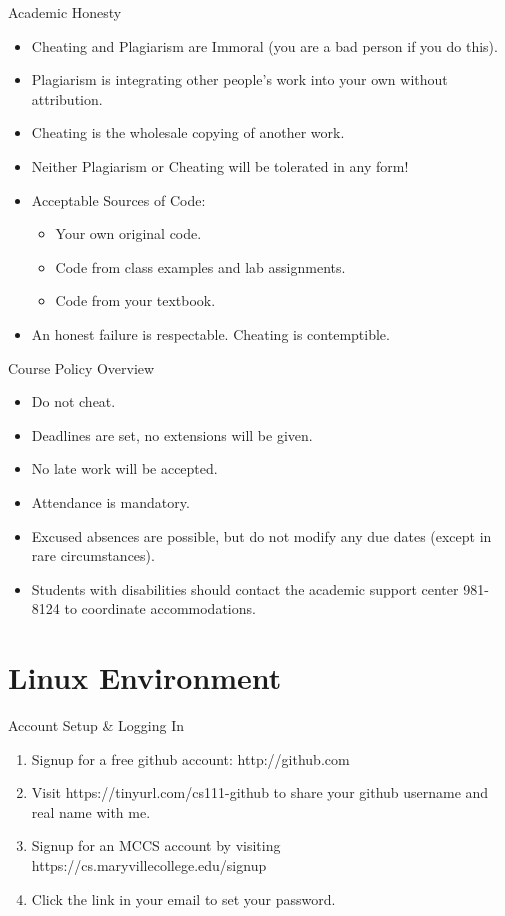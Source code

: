 \documentclass{beamer}
\begin{document}
\begin{frame}{Academic Honesty}
\begin{itemize}[<+->]
    \item Cheating and Plagiarism are Immoral (you are a bad person if
    you do this).
    \item Plagiarism is integrating other people's work into your own
    without attribution.
    \item Cheating is the wholesale copying of another work.
    \item Neither Plagiarism or Cheating will be tolerated in any
    form!
    \item Acceptable Sources of Code:
    \begin{itemize}
        \item Your own original code.
        \item Code from class examples and lab assignments.
        \item Code from your textbook.
    \end{itemize}
    \item An honest failure is respectable.  Cheating is contemptible.
\end{itemize}
\end{frame}

\begin{frame}{Course Policy Overview}
    \begin{itemize}[<+->]
        \item Do not cheat.
        \item Deadlines are set, no extensions will be given.
        \item No late work will be accepted.
        \item Attendance is mandatory.
        \item Excused absences are possible, but do not modify any due
        dates (except in rare circumstances).
        \item Students with disabilities should contact the academic
        support center 981-8124 to coordinate accommodations.
    \end{itemize}
\end{frame}

\section{Linux Environment}

\begin{frame}{Account Setup \& Logging In}
\begin{enumerate}[<+->]
    \item Signup for a free github account: http://github.com 
    \item Visit https://tinyurl.com/cs111-github to share your github
    username and real name with me.
    \item Signup for an MCCS account by visiting
    https://cs.maryvillecollege.edu/signup
    \item Click the link in your email to set your password.
\end{enumerate}
\end{frame}
\end{document}
